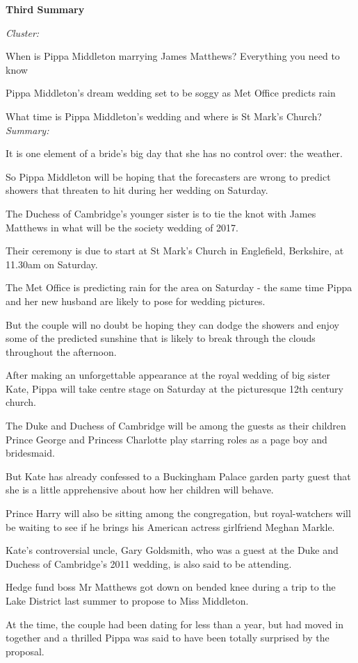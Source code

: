 \documentclass[12pt]{article}
\begin{document}
\textbf{Third Summary}

\begin{mdframed}

\emph{Cluster:}

When is Pippa Middleton marrying James Matthews? Everything you need to know

Pippa Middleton's dream wedding set to be soggy as Met Office predicts rain

What time is Pippa Middleton's wedding and where is St Mark's Church? \\

\emph{Summary:}

It is one element of a bride's big day that she has no control over: the weather.

So Pippa Middleton will be hoping that the forecasters are wrong to predict showers that threaten to hit during her wedding on Saturday.

The Duchess of Cambridge's younger sister is to tie the knot with James Matthews in what will be the society wedding of 2017.

Their ceremony is due to start at St Mark's Church in Englefield, Berkshire, at 11.30am on Saturday.

The Met Office is predicting rain for the area on Saturday - the same time Pippa and her new husband are likely to pose for wedding pictures.

But the couple will no doubt be hoping they can dodge the showers and enjoy some of the predicted sunshine that is likely to break through the clouds throughout the afternoon.

After making an unforgettable appearance at the royal wedding of big sister Kate, Pippa will take centre stage on Saturday at the picturesque 12th century church.

The Duke and Duchess of Cambridge will be among the guests as their children Prince George and Princess Charlotte play starring roles as a page boy and bridesmaid.

But Kate has already confessed to a Buckingham Palace garden party guest that she is a little apprehensive about how her children will behave.

Prince Harry will also be sitting among the congregation, but royal-watchers will be waiting to see if he brings his American actress girlfriend Meghan Markle.

Kate's controversial uncle, Gary Goldsmith, who was a guest at the Duke and Duchess of Cambridge's 2011 wedding, is also said to be attending.

Hedge fund boss Mr Matthews got down on bended knee during a trip to the Lake District last summer to propose to Miss Middleton.

At the time, the couple had been dating for less than a year, but had moved in together and a thrilled Pippa was said to have been totally surprised by the proposal. \\

\end{mdframed}
\end{document}
